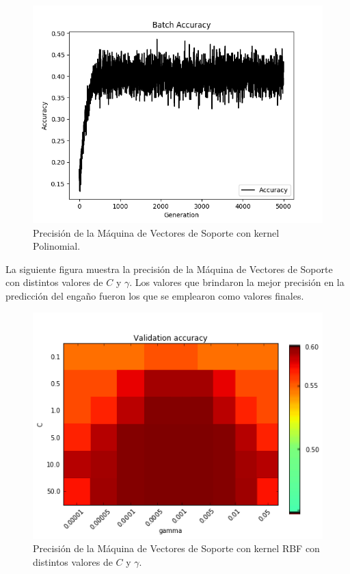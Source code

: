 \begin{figure}
    \centering
    \includegraphics[scale=0.75]{figuras/Figure_3.png}
    \caption{Precisión de la Máquina de Vectores de Soporte con kernel Polinomial.}
    \label{fig:my_label}
\end{figure}
La siguiente figura muestra la precisión de la Máquina de Vectores de Soporte con distintos valores de $C$ y $\gamma$. Los valores que brindaron la mejor precisión en la predicción del engaño fueron los que se emplearon como valores finales.
\begin{figure}
    \centering
    \includegraphics[scale=1]{figuras/58e171451b12ce00012bd71d.png}
    \caption{Precisión de la Máquina de Vectores de Soporte con kernel RBF con distintos valores de $C$ y $\gamma$.}
    \label{fig:my_label}
\end{figure}
